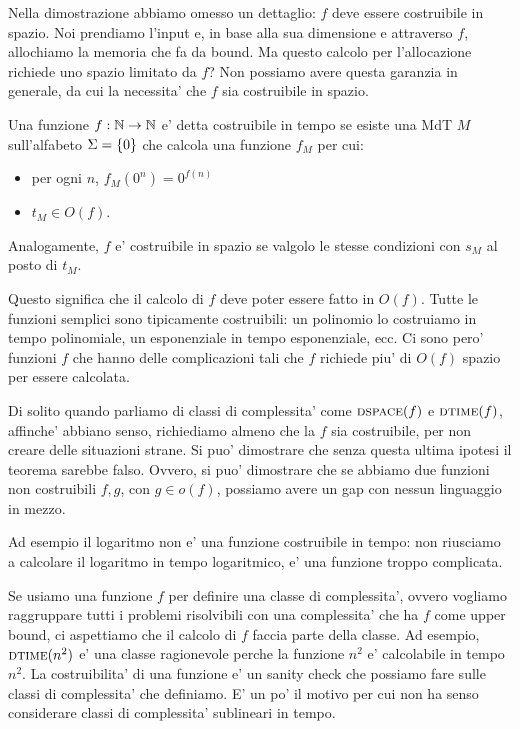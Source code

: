 Nella dimostrazione abbiamo omesso un dettaglio: $f$ deve essere costruibile in spazio. Noi
prendiamo l'input e, in base alla sua dimensione e attraverso $f$, allochiamo la memoria che fa da
bound. Ma questo calcolo per l'allocazione richiede uno spazio limitato da $f$? Non possiamo avere
questa garanzia in generale, da cui la necessita' che $f$ sia costruibile in spazio.

\begin{defn}
    Una funzione $f:\mathbb{N} \to \mathbb{N}$ e' detta costruibile in tempo se esiste una MdT $M$ sull'alfabeto
    $\Sigma = \{0\}$ che calcola una funzione $f_{M}$ per cui:
    \begin{itemize}
        \item per ogni $n$, $f_{M}(0^{n}) = 0^{f(n)}$
        \item $t_{M} \in O(f)$.
    \end{itemize}
    Analogamente, $f$ e' costruibile in spazio se valgolo le stesse condizioni con $s_{M}$ al posto
    di $t_{M}$.
\end{defn}

Questo significa che il calcolo di $f$ deve poter essere fatto in $O(f)$. Tutte le funzioni
semplici sono tipicamente costruibili: un polinomio lo costruiamo in tempo polinomiale, un
esponenziale in tempo esponenziale, ecc. Ci sono pero' funzioni $f$ che hanno delle
complicazioni tali che $f$ richiede piu' di $O(f)$ spazio per essere calcolata.

Di solito quando parliamo di classi di complessita' come $\textsc{dspace}(f)$ e $\textsc{dtime}(f)$, affinche'
abbiano senso, richiediamo almeno che la $f$ sia costruibile, per non creare delle situazioni
strane.  Si puo' dimostrare che senza questa ultima ipotesi il teorema sarebbe falso. Ovvero, si
puo' dimostrare che se abbiamo due funzioni non costruibili $f,g$, con $g \in o(f)$, possiamo avere
un gap con nessun linguaggio in mezzo.

%
Ad esempio il logaritmo non e' una funzione costruibile in tempo: non riusciamo a calcolare il
logaritmo in tempo logaritmico, e' una funzione troppo complicata.

Se usiamo una funzione $f$ per definire una classe di complessita', ovvero vogliamo
raggruppare tutti i problemi risolvibili con una complessita' che ha $f$ come upper bound, ci
aspettiamo che il calcolo di $f$ faccia parte della classe. Ad esempio, $\textsc{dtime}(n^{2})$ e' una
classe ragionevole perche la funzione $n^{2}$ e' calcolabile in tempo $n^{2}$. La costruibilita' di
una funzione e' un sanity check che possiamo fare sulle classi di complessita' che definiamo. E' un
po' il motivo per cui non ha senso considerare classi di complessita' sublineari in tempo.

